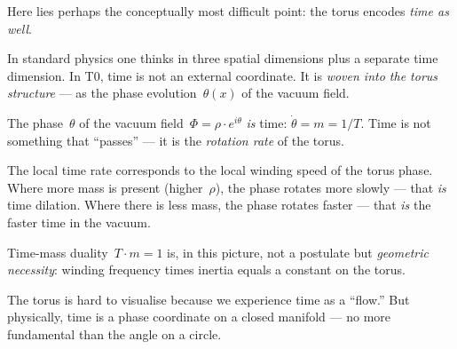 Here lies perhaps the conceptually most difficult point: the torus encodes \emph{time as well}.

In standard physics one thinks in three spatial dimensions plus a separate time dimension. In T0, time is not an external coordinate. It is \emph{woven into the torus structure} --- as the phase evolution~$\theta(x)$ of the vacuum field.

The phase~$\theta$ of the vacuum field~$\Phi = \rho \cdot e^{i\theta}$ \emph{is} time: $\dot{\theta} = m = 1/T$. Time is not something that ``passes'' --- it is the \emph{rotation rate} of the torus.

The local time rate corresponds to the local winding speed of the torus phase. Where more mass is present (higher~$\rho$), the phase rotates more slowly --- that \emph{is} time dilation. Where there is less mass, the phase rotates faster --- that \emph{is} the faster time in the vacuum.

Time-mass duality~$T \cdot m = 1$ is, in this picture, not a postulate but \emph{geometric necessity}: winding frequency times inertia equals a constant on the torus.

\begin{kerngedanke}
The torus is hard to visualise because we experience time as a ``flow.'' But physically, time is a phase coordinate on a closed manifold --- no more fundamental than the angle on a circle.
\end{kerngedanke}
